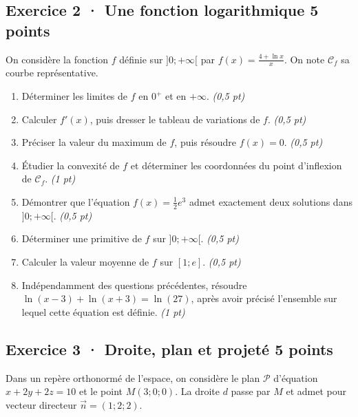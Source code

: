 \subsection*{Exercice 2 · Une fonction logarithmique \hfill 5 points}On considère la fonction $f$ définie sur $]0;+\infty[$ par $f(x)=\frac{4+\ln x}x$. On note $\mathcal C_f$ sa courbe représentative.

\begin{enumerate}

\item Déterminer les limites de $f$ en $0^+$ et en $+\infty$. \hfill\textit{(0,5 pt)}

\item Calculer $f' (x)$, puis dresser le tableau de variations de $f$. \hfill\textit{(0,5 pt)}

\item Préciser la valeur du maximum de $f$, puis résoudre $f(x)=0$. \hfill\textit{(0,5 pt)}

\item Étudier la convexité de $f$ et déterminer les coordonnées du point d'inflexion de $\mathcal C_f$. \hfill\textit{(1 pt)}

\item Démontrer que l'équation $f(x)=\frac12 e^{3}$ admet exactement deux solutions dans $]0;+\infty[$. \hfill\textit{(0,5 pt)}

\item Déterminer une primitive de $f$ sur $]0;+\infty[$. \hfill\textit{(0,5 pt)}

\item Calculer la valeur moyenne de $f$ sur $[1;e]$. \hfill\textit{(0,5 pt)}

\item Indépendamment des questions précédentes, résoudre $\ln(x-3)+\ln(x+3)=\ln(27)$, après avoir précisé l'ensemble sur lequel cette équation est définie. \hfill\textit{(1 pt)}

\end{enumerate}

\clearpage{}\par

\subsection*{Exercice 3 · Droite, plan et projeté \hfill 5 points}Dans un repère orthonormé de l'espace, on considère le plan $\mathcal P$ d'équation $x+2y+2z=10$ et le point $M(3;0;0)$. La droite $d$ passe par $M$ et admet pour vecteur directeur $\vec n=(1;2;2)$.


